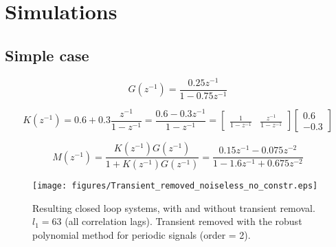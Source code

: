 \section{Simulations}

\subsection{Simple case}

\begin{equation*}
    G(z^{-1}) = \frac{0.25 z^{-1}}{1 - 0.75 z^{-1}}
\end{equation*}

\begin{equation*}
    K(z^{-1}) = 0.6 + 0.3 \frac{z^{-1}}{1-z^{-1}} = \frac{0.6 - 0.3z^{-1}}{1-z^{-1}} = 
    \begin{bmatrix}
        \frac{1}{1-z^{-1}} & \frac{z^{-1}}{1-z^{-1}}
    \end{bmatrix} 
    \begin{bmatrix}
        0.6 \\ -0.3
    \end{bmatrix}
\end{equation*}

\begin{equation*}
    M(z^{-1}) = \frac{K(z^{-1}) G(z^{-1})}{1+K(z^{-1})G(z^{-1})} = \frac{0.15 z^{-1} - 0.075 z^{-2}}{1 - 1.6 z^{-1} + 0.675 z^{-2}}
\end{equation*}



\begin{figure}
    \centering
    \texttt{[image: figures/Transient\_removed\_noiseless\_no\_constr.eps]}
    \caption{Resulting closed loop systems, with and without transient removal. $l_1 = 63$ (all correlation lags). Transient removed with the robust polynomial method for periodic signals (order = 2).}
    \label{fig:simple_case_transient_removed}
\end{figure}
